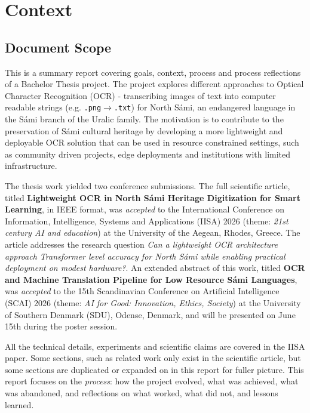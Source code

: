 \chapter{Context}
\label{chap:context}

\section{Document Scope}
\label{sec:doc-scope}

This is a summary report covering goals, context, process and process reflections of a Bachelor Thesis project. The project explores different approaches to Optical Character Recognition (OCR) - transcribing images of text into computer readable strings (e.g. \texttt{.png}$\rightarrow$\texttt{.txt}) for North S\'{a}mi, an endangered language in the S\'{a}mi branch of the Uralic family. The motivation is to contribute to the preservation of S\'{a}mi cultural heritage by developing a more lightweight and deployable OCR solution that can be used in resource constrained settings, such as community driven projects, edge deployments and institutions with limited infrastructure.

The thesis work yielded two conference submissions. The full scientific article, titled \textbf{Lightweight OCR in North S\'{a}mi Heritage Digitization for Smart Learning}, in IEEE format, was \emph{accepted} to the International Conference on Information, Intelligence, Systems and Applications (IISA) 2026 (theme: \textit{21st century AI and education}) at the University of the Aegean, Rhodes, Greece. The article addresses the research question \textit{Can a lightweight OCR architecture approach Transformer level accuracy for North S\'{a}mi while enabling practical deployment on modest hardware?}.
An extended abstract of this work, titled \textbf{OCR and Machine Translation Pipeline for Low Resource S\'{a}mi Languages}, was \emph{accepted} to the 15th Scandinavian Conference on Artificial Intelligence (SCAI) 2026 (theme: \textit{AI for Good: Innovation, Ethics, Society}) at the University of Southern Denmark (SDU), Odense, Denmark, and will be presented on June 15th during the poster session.

All the technical details, experiments and scientific claims are covered in the IISA paper. Some sections, such as related work only exist in the scientific article, but some sections are duplicated or expanded on in this report for fuller picture. This report focuses on the \emph{process}: how the project evolved, what was achieved, what was abandoned, and reflections on what worked, what did not, and lessons learned.


